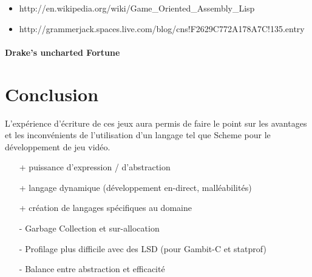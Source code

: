 \documentclass[12pt,oneside,letterpaper,francais]{book}
\begin{document}
\begin{itemize}
\item http://en.wikipedia.org/wiki/Game\_Oriented\_Assembly\_Lisp
\item http://grammerjack.spaces.live.com/blog/cns!F2629C772A178A7C!135.entry
\end{itemize}

\subsubsection{Drake's uncharted Fortune}


\chapter{Conclusion}


L'expérience d'écriture de ces jeux aura permis de faire le point sur
les avantages et les inconvénients de l'utilisation d'un langage tel
que Scheme pour le développement de jeu vidéo.


\begin{itemize}
  \item[+] puissance d'expression / d'abstraction
  \item[+] langage dynamique (développement en-direct, malléabilités)
  \item[+] création de langages spécifiques au domaine

  \item[-] Garbage Collection et sur-allocation
  \item[-] Profilage plus difficile avec des LSD (pour Gambit-C et statprof)
  \item[-] Balance entre abstraction et efficacité
\end{itemize}





\appendix
\end{document}
